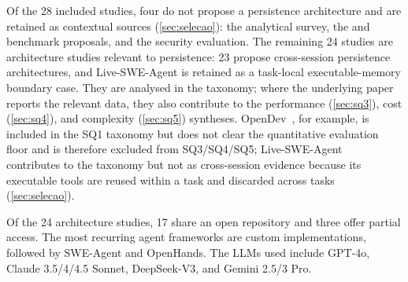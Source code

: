 Of the 28 included studies, four do not propose a persistence
architecture and are retained as contextual sources
(\autoref{sec:selecao}):
the \citet{du2026memory} analytical survey,
the \citet{deshpande2025memtrack} and \citet{joshi2025swebenchcl}
benchmark proposals, and the \citet{srivastava2025memorygraft} security
evaluation.
The remaining 24 studies are architecture studies relevant to
persistence:
23 propose cross-session persistence architectures, and
Live-SWE-Agent is retained as a task-local executable-memory boundary
case.
They are analysed in the taxonomy;
where the underlying paper reports the relevant data, they also
contribute to the performance (\autoref{sec:sq3}), cost
(\autoref{sec:sq4}), and complexity (\autoref{sec:sq5}) syntheses.
OpenDev~\citep{bui2026opendev}, for example, is included in the SQ1
taxonomy but does not clear the quantitative evaluation floor and is
therefore excluded from SQ3/SQ4/SQ5;
Live-SWE-Agent~\citep{xia2025livesweagent} contributes to the taxonomy
but not as cross-session evidence because its executable tools are
reused within a task and discarded across tasks
(\autoref{sec:selecao}).

Of the 24 architecture studies, 17 share an open repository and three
offer partial access.
The most recurring agent frameworks are custom implementations, followed
by SWE-Agent and OpenHands.
The LLMs used include GPT-4o, Claude 3.5/4/4.5 Sonnet, DeepSeek-V3,
and Gemini 2.5/3 Pro.

